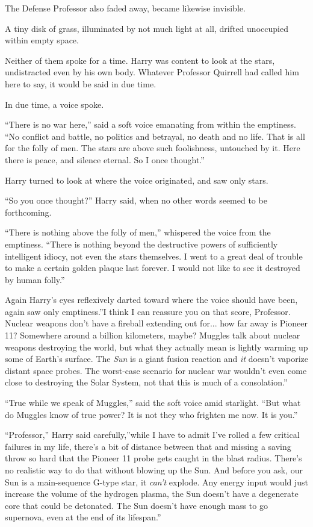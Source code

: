 The Defense Professor also faded away, became likewise invisible.

A tiny disk of grass, illuminated by not much light at all, drifted
unoccupied within empty space.

Neither of them spoke for a time. Harry was content to look at the
stars, undistracted even by his own body. Whatever Professor Quirrell
had called him here to say, it would be said in due time.

In due time, a voice spoke.

``There is no war here,'' said a soft voice emanating from within the
emptiness. ``No conflict and battle, no politics and betrayal, no death
and no life. That is all for the folly of men. The stars are above such
foolishness, untouched by it. Here there is peace, and silence eternal.
So I once thought.''

Harry turned to look at where the voice originated, and saw only stars.

``So you once thought?'' Harry said, when no other words seemed to be
forthcoming.

``There is nothing above the folly of men,'' whispered the voice from
the emptiness. ``There is nothing beyond the destructive powers of
sufficiently intelligent idiocy, not even the stars themselves. I went
to a great deal of trouble to make a certain golden plaque last forever.
I would not like to see it destroyed by human folly.''

Again Harry's eyes reflexively darted toward where the voice should have
been, again saw only emptiness.''I think I can reassure you on that
score, Professor. Nuclear weapons don't have a fireball extending out
for... how far away is Pioneer 11? Somewhere around a billion
kilometers, maybe? Muggles talk about nuclear weapons destroying the
world, but what they actually mean is lightly warming up some of Earth's
surface. The \emph{Sun} is a giant fusion reaction and \emph{it} doesn't
vaporize distant space probes. The worst-case scenario for nuclear war
wouldn't even come close to destroying the Solar System, not that this
is much of a consolation.''

``True while we speak of Muggles,'' said the soft voice amid starlight.
``But what do Muggles know of true power? It is not they who frighten me
now. It is you.''

``Professor,'' Harry said carefully,''while I have to admit I've rolled
a few critical failures in my life, there's a bit of distance between
that and missing a saving throw so hard that the Pioneer 11 probe gets
caught in the blast radius. There's no realistic way to do that without
blowing up the Sun. And before you ask, our Sun is a main-sequence
G-type star, it \emph{can't} explode. Any energy input would just
increase the volume of the hydrogen plasma, the Sun doesn't have a
degenerate core that could be detonated. The Sun doesn't have enough
mass to go supernova, even at the end of its lifespan.''

